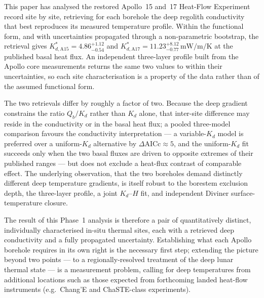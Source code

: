 \documentclass[11pt]{article}
\begin{document}
This paper has analysed the restored Apollo~15 and~17 Heat-Flow
Experiment record site by site, retrieving for each borehole the deep
regolith conductivity that best reproduces its measured temperature
profile. Within the \citet{hayne2017} functional form, and with
uncertainties propagated through a non-parametric bootstrap, the
retrieval gives
$K_{d,\mathrm{A15}}^{*}=4.86^{+1.12}_{-0.54}$ and
$K_{d,\mathrm{A17}}^{*}=11.23^{+8.12}_{-0.77}\,\si{\milli\watt\per\meter\per\kelvin}$
at the published basal heat flux. An independent three-layer profile
built from the Apollo core measurements returns the same two values
to within their uncertainties, so each site characterisation is a
property of the data rather than of the assumed functional form.

The two retrievals differ by roughly a factor of two. Because the
deep gradient constrains the ratio $Q_b/K_d$ rather than $K_d$ alone,
that inter-site difference may reside in the conductivity or in the
basal heat flux; a pooled three-model comparison favours the
conductivity interpretation --- a variable-$K_d$ model is preferred
over a uniform-$K_d$ alternative by $\Delta\mathrm{AICc}\approx5$, and
the uniform-$K_d$ fit succeeds only when the two basal fluxes are
driven to opposite extremes of their published ranges --- but does not
exclude a heat-flux contrast of comparable effect. The underlying
observation, that the two boreholes demand distinctly different deep
temperature gradients, is itself robust to the borestem exclusion
depth, the three-layer profile, a joint $K_d$--$H$ fit, and
independent Diviner surface-temperature closure.

The result of this Phase~1 analysis is therefore a pair of
quantitatively distinct, individually characterised in-situ thermal
sites, each with a retrieved deep conductivity and a fully propagated
uncertainty. Establishing what each Apollo borehole requires in its
own right is the necessary first step; extending the picture beyond
two points --- to a regionally-resolved treatment of the deep lunar
thermal state --- is a measurement problem, calling for deep
temperatures from additional locations such as those expected from
forthcoming landed heat-flow instruments (e.g.\ Chang'E and
ChaSTE-class experiments).

\end{document}
